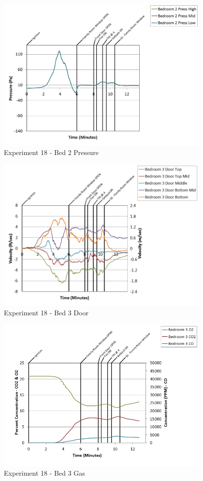 \documentclass{article}
\begin{document}
\begin{appendices}
\clearpage

\begin{figure}[h!]
	\centering
	\includegraphics[height=3.05in]{0_Images/Results_Charts/Exp_18_Charts/Bed2Pressure.png}
	\caption{Experiment 18 - Bed 2 Pressure}
\end{figure}


\begin{figure}[h!]
	\centering
	\includegraphics[height=3.05in]{0_Images/Results_Charts/Exp_18_Charts/Bed3Door.png}
	\caption{Experiment 18 - Bed 3 Door}
\end{figure}

\clearpage

\begin{figure}[h!]
	\centering
	\includegraphics[height=3.05in]{0_Images/Results_Charts/Exp_18_Charts/Bed3Gas.png}
	\caption{Experiment 18 - Bed 3 Gas}
\end{figure}



\end{appendices}
\end{document}
